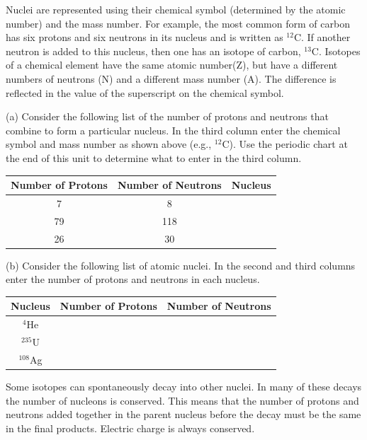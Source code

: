 Nuclei are represented using their chemical symbol (determined by
the atomic number) and the mass number. For example, the most common
form of carbon has six protons and six neutrons in its nucleus and
is written as \( ^{12} \)C. If another neutron is added to this nucleus,
then one has an isotope of carbon, \( ^{13} \)C. Isotopes of a chemical element
have the same atomic number(Z), but have a different numbers of neutrons
(N) and a different mass number (A). The difference is reflected in
the value of the superscript on the chemical symbol.

(a) Consider the following list of the number of protons and neutrons
that combine to form a particular nucleus. In the third column enter the chemical
symbol and mass number as shown above (e.g., \( ^{12} \)C). Use the
periodic chart at the end of this unit to determine what to enter in the third
column.

\vspace{0.3cm}
{\centering \begin{tabular}{|c|c|c|}
\hline 
Number of Protons&
Number of Neutrons&
Nucleus\\
\hline
\hline 
7&
8&
\\
\hline 
79&
118&
\\
\hline 
26&
30&
\\
\hline
\end{tabular}\par}
\vspace{0.3cm}

(b) Consider the following list of atomic nuclei. In the second and
third columns enter the number of protons and neutrons in each nucleus.

\vspace{0.3cm}
{\centering \begin{tabular}{|c|c|c|}
\hline 
Nucleus&
Number of Protons&
Number of Neutrons\\
\hline
\hline 
\( ^{4} \)He&
&
\\
\hline 
\( ^{235} \)U&
&
\\
\hline 
\( ^{108} \)Ag&
&
\\
\hline
\end{tabular}\par}
\vspace{0.3cm}

Some isotopes can spontaneously decay into other nuclei.
In many of these decays the number of nucleons is conserved. 
This
means that the number of protons and neutrons added together in the parent nucleus before
the decay must be the same in the final products.
Electric charge
is always conserved.

